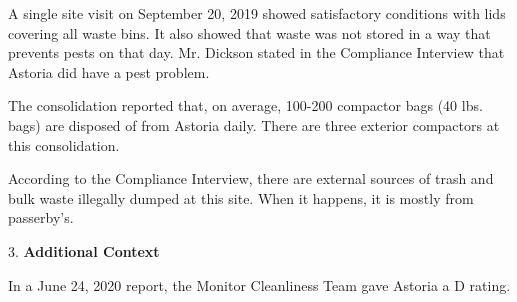 A single site visit on September 20, 2019 showed satisfactory conditions with lids covering all waste bins. It also showed that waste was not stored in a way that prevents pests on that day. Mr. Dickson stated in the Compliance Interview that Astoria did have a pest problem.

The consolidation reported that, on average, 100-200 compactor bags (40 lbs. bags) are disposed of from Astoria daily. There are three exterior compactors at this consolidation. 

According to the Compliance Interview, there are external sources of trash and bulk waste illegally dumped at this site. When it happens, it is mostly from passerby's. 

3. \textbf{Additional Context}

In a June 24, 2020 report, the Monitor Cleanliness Team gave Astoria a D rating.